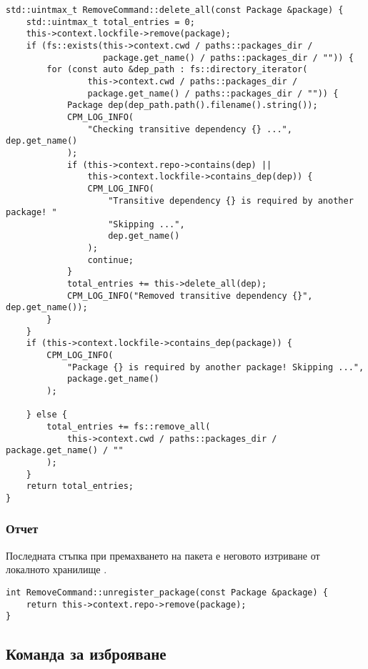 \begin{lstlisting}[style=cpp,
				   caption=Функция за изтриване на пакет,
				   label={lst:remove-delete}]
std::uintmax_t RemoveCommand::delete_all(const Package &package) {
    std::uintmax_t total_entries = 0;
    this->context.lockfile->remove(package);
    if (fs::exists(this->context.cwd / paths::packages_dir /
				   package.get_name() / paths::packages_dir / "")) {
        for (const auto &dep_path : fs::directory_iterator(
				this->context.cwd / paths::packages_dir /
                package.get_name() / paths::packages_dir / "")) {
            Package dep(dep_path.path().filename().string());
            CPM_LOG_INFO(
				"Checking transitive dependency {} ...", dep.get_name()
			);
            if (this->context.repo->contains(dep) ||
				this->context.lockfile->contains_dep(dep)) {
                CPM_LOG_INFO(
                    "Transitive dependency {} is required by another package! "
					"Skipping ...",
                    dep.get_name()
                );
                continue;
            }
            total_entries += this->delete_all(dep);
            CPM_LOG_INFO("Removed transitive dependency {}", dep.get_name());
        }
    }
    if (this->context.lockfile->contains_dep(package)) {
        CPM_LOG_INFO(
            "Package {} is required by another package! Skipping ...",
            package.get_name()
        );

    } else {
        total_entries += fs::remove_all(
			this->context.cwd / paths::packages_dir / package.get_name() / ""
		);
    }
    return total_entries;
}
\end{lstlisting}


\subsubsection{Отчет}

Последната стъпка при премахването на пакета е неговото изтриване от локалното
хранилище .

\begin{lstlisting}[style=cpp,
				   caption=Функция за отчитане на пакет,
				   label={lst:remove-register}]
int RemoveCommand::unregister_package(const Package &package) {
	return this->context.repo->remove(package);
}
\end{lstlisting}


\subsection{Команда за изброяване}


